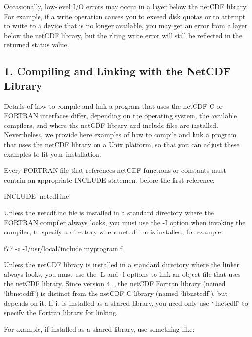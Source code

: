 Occasionally, low-\/level I/O errors may occur in a layer below the net\+C\+DF library. For example, if a write operation causes you to exceed disk quotas or to attempt to write to a device that is no longer available, you may get an error from a layer below the net\+C\+DF library, but the rlting write error will still be reflected in the returned status value.\hypertarget{nc_f77_interface_guide_f77_Compiling_and_Linking_with_the_NetCDF_Library}{}\subsection{1. Compiling and Linking with the Net\+C\+D\+F Library }\label{nc_f77_interface_guide_f77_Compiling_and_Linking_with_the_NetCDF_Library}
Details of how to compile and link a program that uses the net\+C\+DF C or F\+O\+R\+T\+R\+AN interfaces differ, depending on the operating system, the available compilers, and where the net\+C\+DF library and include files are installed. Nevertheless, we provide here examples of how to compile and link a program that uses the net\+C\+DF library on a Unix platform, so that you can adjust these examples to fit your installation.

Every F\+O\+R\+T\+R\+AN file that references net\+C\+DF functions or constants must contain an appropriate I\+N\+C\+L\+U\+DE statement before the first reference\+: \begin{DoxyVerb}INCLUDE 'netcdf.inc'
\end{DoxyVerb}


Unless the netcdf.\+inc file is installed in a standard directory where the F\+O\+R\+T\+R\+AN compiler always looks, you must use the -\/I option when invoking the compiler, to specify a directory where netcdf.\+inc is installed, for example\+: \begin{DoxyVerb}f77 -c -I/usr/local/include myprogram.f
\end{DoxyVerb}


Unless the net\+C\+DF library is installed in a standard directory where the linker always looks, you must use the -\/L and -\/l options to link an object file that uses the net\+C\+DF library. Since version 4.., the net\+C\+DF Fortran library (named ‘libnetcdff’) is distinct from the net\+C\+DF C library (named ‘libnetcdf’), but depends on it. If it is installed as a shared library, you need only use ‘-\/lnetcdff’ to specify the Fortran library for linking.

For example, if installed as a shared library, use something like\+:

